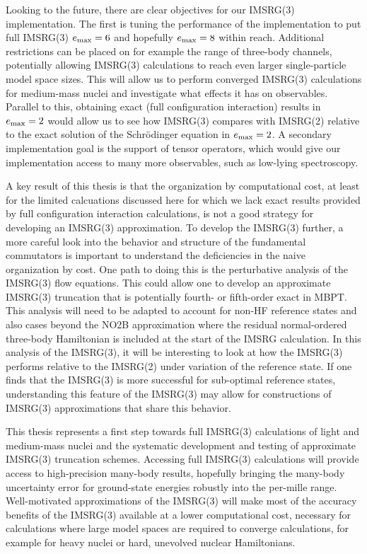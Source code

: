 Looking to the future,
there are clear objectives for our IMSRG(3) implementation.
The first is tuning the performance of the implementation
to put full IMSRG(3) $e_{\text{max}}=6$ and hopefully $e_{\text{max}}=8$
within reach.
Additional restrictions can be placed on
for example the range of three-body channels,
potentially allowing IMSRG(3) calculations
to reach even larger single-particle model space sizes.
This will allow us to perform converged IMSRG(3) calculations
for medium-mass nuclei
and investigate what effects it has on observables.
Parallel to this,
obtaining exact (full configuration interaction) results
in $e_{\text{max}}=2$
would allow us to see how IMSRG(3)
compares with IMSRG(2)
relative to the exact solution
of the Schr{\"o}dinger equation
in $e_{\text{max}}=2$.
A secondary implementation goal
is the support of tensor operators,
which would give our implementation access to many more observables,
such as low-lying spectroscopy.

A key result of this thesis is that the organization by computational cost,
at least for the limited calcuations discussed here
for which we lack exact results
provided by full configuration interaction calculations,
is not a good strategy for developing an IMSRG(3) approximation.
To develop the IMSRG(3) further,
a more careful look into the behavior and structure of the fundamental commutators
is important
to understand the deficiencies in the naive organization by cost.
One path to doing this is the perturbative analysis
of the IMSRG(3) flow equations.
This could allow one to develop an approximate IMSRG(3) truncation
that is potentially fourth- or fifth-order exact in MBPT.
This analysis will need to be adapted
to account for non-HF reference states
and also cases beyond the NO2B approximation
where the residual normal-ordered three-body Hamiltonian
is included at the start of the IMSRG calculation.
In this analysis of the IMSRG(3),
it will be interesting to look at how the IMSRG(3)
performs relative to the IMSRG(2) under variation of the reference state.
If one finds that the IMSRG(3) is more successful
for sub-optimal reference states,
understanding this feature of the IMSRG(3)
may allow for constructions of IMSRG(3) approximations
that share this behavior.

This thesis represents a first step
towards full IMSRG(3) calculations
of light and medium-mass nuclei
and the systematic development and testing
of approximate IMSRG(3) truncation schemes.
Accessing full IMSRG(3) calculations
will provide access to high-precision many-body results,
hopefully bringing the many-body uncertainty error
for ground-state energies robustly into the per-mille range.
Well-motivated approximations of the IMSRG(3)
will make most of the accuracy benefits of the IMSRG(3)
available at a lower computational cost,
necessary for calculations where large model spaces
are required to converge calculations,
for example for heavy nuclei or hard, unevolved nuclear Hamiltonians.

